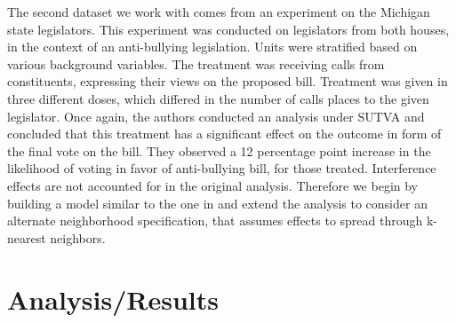 \documentclass[12pt]{article}
\begin{document}
The second dataset we work with comes from an experiment on the Michigan state legislators. This experiment was conducted on legislators from both houses, in the context of an anti-bullying legislation. Units were stratified based on various background variables. The treatment was receiving calls from constituents, expressing their views on the proposed bill. Treatment was given in three different doses, which differed in the number of calls places to the given legislator. Once again, the authors conducted an analysis under SUTVA and concluded that this treatment has a significant effect on the outcome in form of the final vote on the bill. They observed a 12 percentage point  increase in the likelihood of voting in favor of anti-bullying bill, for those treated. Interference effects are not accounted for in the original analysis. Therefore we begin by building a model similar to the one in \citet{coppock2014information} and extend the analysis to consider an alternate neighborhood specification, that assumes effects to spread through k-nearest neighbors.




\section{Analysis/Results}
\end{document}

